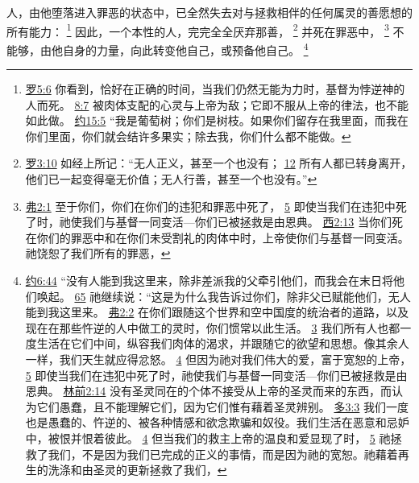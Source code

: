 \documentclass[12pt, a4paper, oneside]{ctexart}
\newcounter{parnum}[section]
\newcommand{\N}{%
   \noindent\refstepcounter{parnum}%
    \makebox[\parindent][l]{\textbf{\arabic{parnum}.}}}
\begin{document}
\N 人，由他堕落进入罪恶的状态中，已全然失去对与拯救相伴的任何属灵的善愿想的所有能力：
	\footnote {
		\href{https://biblehub.com/romans/5-6.htm}{罗5:6} 你看到，恰好在正确的时间，当我们仍然无能为力时，基督为悖逆神的人而死。
		\href{https://biblehub.com/romans/8-7.htm}{8:7} 被肉体支配的心灵与上帝为敌；它即不服从上帝的律法，也不能如此做。
		\href{https://biblehub.com/john/15-5.htm}{约15:5} “我是葡萄树；你们是树枝。如果你们留存在我里面，而我在你们里面，你们就会结许多果实；除去我，你们什么都不能做。
	}
	因此，一个本性的人，完完全全厌弃那善，
	\footnote {
		\href{https://biblehub.com/romans/3-10.htm}{罗3:10} 如经上所记：“无人正义，甚至一个也没有；
		\href{https://biblehub.com/romans/3-12.htm}{12} 所有人都已转身离开，他们已一起变得毫无价值；无人行善，甚至一个也没有。”
	}
	并死在罪恶中，
	\footnote {
		\href{https://biblehub.com/ephesians/2-1.htm}{弗2:1} 至于你们，你们在你们的违犯和罪恶中死了， 
		\href{https://biblehub.com/ephesians/2-5.htm}{5} 即使当我们在违犯中死了时，祂使我们与基督一同变活---你们已被拯救是由恩典。
		\href{https://biblehub.com/colossians/2-13.htm}{西2:13} 当你们死在你们的罪恶中和在你们未受割礼的肉体中时，上帝使你们与基督一同变活。祂饶恕了我们所有的罪恶，
	}
	不能够，由他自身的力量，向此转变他自己，或预备他自己。
	\footnote {
		\href{https://biblehub.com/john/6-44.htm}{约6:44} “没有人能到我这里来，除非差派我的父牵引他们，而我会在末日将他们唤起。
		\href{https://biblehub.com/john/6-65.htm}{65} 祂继续说：“这是为什么我告诉过你们，除非父已赋能他们，无人能到我这里来。
		\href{https://biblehub.com/ephesians/2-2.htm}{弗2:2} 在你们跟随这个世界和空中国度的统治者的道路，以及现在在那些忤逆的人中做工的灵时，你们惯常以此生活。
		\href{https://biblehub.com/ephesians/2-3.htm}{3} 我们所有人也都一度生活在它们中间，纵容我们肉体的渴求，并跟随它的欲望和思想。像其余人一样，我们天生就应得忿怒。
		\href{https://biblehub.com/ephesians/2-4.htm}{4} 但因为祂对我们伟大的爱，富于宽恕的上帝，
		\href{https://biblehub.com/ephesians/2-5.htm}{5} 即使当我们在违犯中死了时，祂使我们与基督一同变活---你们已被拯救是由恩典。
		\href{https://biblehub.com/1_corinthians/2-14.htm}{林前2:14} 没有圣灵同在的个体不接受从上帝的圣灵而来的东西，而认为它们愚蠢，且不能理解它们，因为它们惟有藉着圣灵辨别。
		\href{https://biblehub.com/titus/3-3.htm}{多3:3} 我们一度也是愚蠢的、忤逆的、被各种情感和欲念欺骗和奴役。我们生活在恶意和忌妒中，被恨并恨着彼此。
		\href{https://biblehub.com/titus/3-4.htm}{4} 但当我们的救主上帝的温良和爱显现了时，
		\href{https://biblehub.com/titus/3-5.htm}{5} 祂拯救了我们，不是因为我们已完成的正义的事情，而是因为祂的宽恕。祂藉着再生的洗涤和由圣灵的更新拯救了我们，
	}
\end{document}
